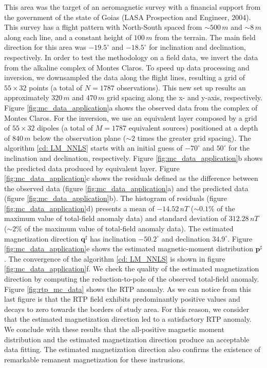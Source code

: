 This area was the target of an aeromagnetic survey with a financial support from the government of the state of Goias (LASA Prospection and Engineer, 2004). This survey has a flight pattern with North-South spaced from $\sim 500 \, m$ and $ \sim 8 \, m$ along each line, and a constant height of $100 \, m$ from the terrain. The main field direction for this area was $-19.5^\circ$ and $-18.5^\circ$ for inclination and declination, respectively. In order to test the methodology on a field data, we invert the data from the alkaline complex of Montes Claros. To speed up data processing and inversion, we downsampled the data along the flight lines, resulting a grid of $55 \times 32$ points (a total of $N=1787$ observations). This new set up results an approximately $320 \, m$ and $470 \, m$ grid spacing along the x- and y-axis, respectively. Figure \ref{fig:mc_data_application}a shows the observed data from the complex of Montes Claros. For the inversion, we use an equivalent layer composed by a grid of $55 \times 32$ dipoles (a total of $M=1787$ equivalent sources) positioned at a depth of $840 \, m$ below the observation plane ($\sim 2$ times the greater grid spacing). The algorithm \ref{cd: LM_NNLS} starts with an initial guess of $-70^\circ$ and $50^\circ$ for the inclination and declination, respectively. Figure \ref{fig:mc_data_application}b shows the predicted data produced by equivalent layer. Figure \ref{fig:mc_data_application}c shows the residuals defined as the difference between the observed data (figure \ref{fig:mc_data_application}a) and the predicted data (figure \ref{fig:mc_data_application}b). The histogram of residuals (figure \ref{fig:mc_data_application}d) presents a mean of $-14.52 \, nT$ ($\sim 0.1\% $ of the maximum value of total-field anomaly data) and standard deviation of $312.28 \, nT$ ($\sim 2 \% $ of the maximum value of total-field anomaly data). The estimated magnetization direction $\mathbf{q}^\sharp$ has inclination $-50.2^\circ$ and declination $34.9^\circ$. Figure \ref{fig:mc_data_application}e shows the estimated magnetic-moment distribution $\mathbf{p}^\sharp$. The convergence of the algorithm \ref{cd: LM_NNLS} is shown in figure \ref{fig:mc_data_application}f. We check the quality of the estimated magnetization direction by computing the reduction-to-pole of the observed total-field anomaly. Figure \ref{fig:rtp_mc_data} shows the RTP anomaly. As we can notice from this last figure is that the RTP field exhibits predominantly positive values and decays to zero towards the borders of study area. For this reason, we consider that the estimated magnetization direction led to a satisfactory RTP anomaly. We conclude with these results that the all-positive magnetic moment distribution and the estimated magnetization direction produce an acceptable data fitting. The estimated magnetization direction also confirms the existence of remarkable remanent magnetization for these instrusions. 



